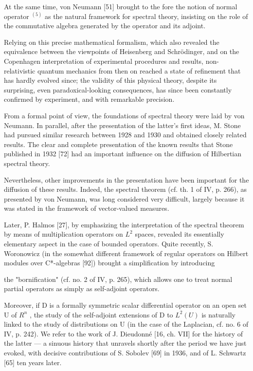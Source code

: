 At the same time, von Neumann {[}51{]} brought to the fore the notion of normal operator \(^{(5)}\) as the natural framework for spectral theory, insisting on the role of the commutative algebra generated by the operator and its adjoint.

Relying on this precise mathematical formalism, which also revealed the equivalence between the viewpoints of Heisenberg and Schrödinger, and on the Copenhagen interpretation of experimental procedures and results, non-relativistic quantum mechanics from then on reached a state of refinement that has hardly evolved since; the validity of this physical theory, despite its surprising, even paradoxical-looking consequences, has since been constantly confirmed by experiment, and with remarkable precision.

From a formal point of view, the foundations of spectral theory were laid by von Neumann. In parallel, after the presentation of the latter's first ideas, M. Stone had pursued similar research between 1928 and 1930 and obtained closely related results. The clear and complete presentation of the known results that Stone published in 1932 {[}72{]} had an important influence on the diffusion of Hilbertian spectral theory.

Nevertheless, other improvements in the presentation have been important for the diffusion of these results. Indeed, the spectral theorem (cf. th. 1 of IV, p. 266), as presented by von Neumann, was long considered very difficult, largely because it was stated in the framework of vector-valued measures.

Later, P. Halmos {[}27{]}, by emphasizing the interpretation of the spectral theorem by means of multiplication operators on \(L^{2}\) spaces, revealed its essentially elementary aspect in the case of bounded operators. Quite recently, S. Woronowicz (in the somewhat different framework of regular operators on Hilbert modules over C*-algebras {[}92{]}) brought a simplification by introducing

the "bornification" (cf. no. 2 of IV, p. 265), which allows one to treat normal partial operators as simply as self-adjoint operators.

Moreover, if D is a formally symmetric scalar differential operator on an open set U of \(R^{n}\) , the study of the self-adjoint extensions of D to \(L^{2}(U)\) is naturally linked to the study of distributions on U (in the case of the Laplacian, cf. no. 6 of IV, p. 242). We refer to the work of J. Dieudonné {[}16, ch. VII{]} for the history of the latter --- a sinuous history that unravels shortly after the period we have just evoked, with decisive contributions of S. Sobolev {[}69{]} in 1936, and of L. Schwartz {[}65{]} ten years later.

